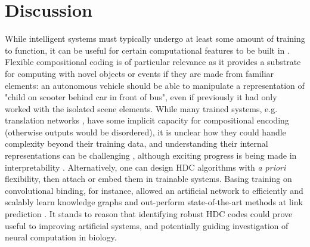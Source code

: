 \documentclass{article}
\begin{document}
\section{Discussion}

While intelligent systems must typically undergo at least some amount of training to function, it can be useful for certain computational features to be built in \cite{Zador:2019}. Flexible compositional coding is of particular relevance as it provides a substrate for computing with novel objects or events if they are made from familiar elements: an autonomous vehicle should be able to manipulate a representation of "child on scooter behind car in front of bus", even if previously it had only worked with the isolated scene elements. While many trained systems, e.g. translation networks \cite{Bahdanau:2014, Luong:2015, Wu:2016}, have some implicit capacity for compositional encoding (otherwise outputs would be disordered), it is unclear how they could handle complexity beyond their training data, and understanding their internal representations can be challenging \cite{Lipton:2016}, although exciting progress is being made in interpretability \cite{Zeiler:2014, Montavon:2018}. Alternatively, one can design HDC algorithms with \textit{a priori} flexibility, then attach or embed them in trainable systems. Basing training on convolutional binding, for instance, allowed an artificial network to efficiently and scalably learn knowledge graphs and out-perform state-of-the-art methods at link prediction \cite{Nickel:2016}. It stands to reason that identifying robust HDC codes could prove useful to improving artificial systems, and potentially guiding investigation of neural computation in biology.
\end{document}
